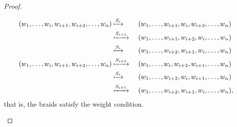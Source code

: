 \documentclass{article}
\begin{document}
\begin{proof}
\begin{enumerate}[(a)]
\begin{alignat*}{2}
      (w_1, \hdots, w_i, w_{i+1}, w_{i+2}, \hdots, w_n)
      &\xmapsto{S_i}     &&\ (w_1, \hdots, w_{i+1}, w_i, w_{i+2}, \hdots, w_n) \\
      &\xmapsto{S_{i+1}} &&\ (w_1, \hdots, w_{i+1}, w_{i+2}, w_{i}, \hdots, w_n) \\
      &\xmapsto{S_{i}}   &&\ (w_1, \hdots, w_{i+2}, w_{i+1}, w_{i}, \hdots, w_n) \\
      (w_1, \hdots, w_i, w_{i+1}, w_{i+2}, \hdots, w_n)
      &\xmapsto{S_{i+1}} &&\ (w_1, \hdots, w_{i}, w_{i+2}, w_{i+1}, \hdots, w_n) \\
      &\xmapsto{S_{i}}   &&\ (w_1, \hdots, w_{i+2}, w_{i}, w_{i+1}, \hdots, w_n) \\
      &\xmapsto{S_{i+1}} &&\ (w_1, \hdots, w_{i+2}, w_{i+1}, w_{i}, \hdots, w_n),
    \end{alignat*}
    that is, the braids satisfy the weight condition.
  \end{enumerate}
\end{proof}
\end{document}
